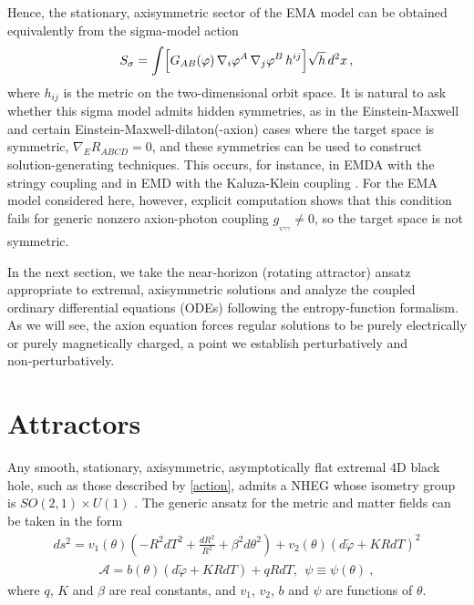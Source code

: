 \documentclass[11pt]{article}
\numberwithin{equation}{section} %
\begin{document}
Hence, the stationary, axisymmetric sector of the EMA model can be obtained equivalently from the sigma-model action
%
\begin{equation}
\label{eq:sigma-action}
S_\sigma
 = \int \Bigl[ G_{AB}(\varphi)\,\nabla_i\varphi^A\,\nabla_j\varphi^B\,h^{ij}\Bigr]\sqrt{h}\,d^2x\,,
\end{equation}
%
where \(h_{ij}\) is the metric on the two-dimensional orbit space. It is natural to ask whether this sigma model admits hidden symmetries, as in the Einstein-Maxwell and certain Einstein-Maxwell-dilaton(-axion) cases where the target space is symmetric, \(\nabla_E R_{ABCD} = 0\), and these symmetries can be used to construct solution-generating techniques. This occurs, for instance, in EMDA with the stringy coupling and in EMD with the Kaluza-Klein coupling \cite{Galtsov:1995zm,Yazadjiev:2010bj,Wells:1998gc}. For the EMA model considered here, however, explicit computation shows that this condition fails for generic nonzero axion-photon coupling \(g_{_{\psi\gamma\gamma}} \neq 0\), so the target space is not symmetric.



\bigskip

In the next section, we take the near‑horizon (rotating attractor) ansatz appropriate to extremal, axisymmetric solutions and analyze the coupled ordinary differential equations (ODEs) following the entropy‑function   {formalism}. As we will see, the axion equation forces regular solutions to be purely electrically or purely magnetically charged, a point we establish perturbatively and non‑perturbatively.


\section{Attractors}\label{attractors}

Any smooth, stationary, axisymmetric, asymptotically flat extremal 4D black hole, such as those described by \eqref{action}, admits a NHEG whose isometry group is $SO(2,1)\times U(1)$ \cite{Reall:2002bh,Kunduri:2007vf}. The generic ansatz for the metric and matter fields can be taken in the form \cite{Kunduri:2007vf,Astefanesei:2006dd,Astefanesei:2007bf}
%
\begin{eqnarray} 
\label{metric}
ds^2= v_1(\theta) 
\left(
      -R^2 dT^2+\frac{dR^2}{R^2}+\beta^2 d\theta^2
\right)
+v_2(\theta)  (d \tilde \varphi+K R dT)^2
\end{eqnarray} 
%
\begin{eqnarray} 
\label{matter-nh}
\mathcal{A}=b (\theta) (d \tilde \varphi+ K R dT)+q R dT,~~\psi \equiv \psi(\theta)~,
\end{eqnarray}
where $q$, $K$ and $\beta$ are real constants, and $v_{1}$, $v_{2}$, $b$ and $\psi$ are functions of $\theta$.
\end{document}
